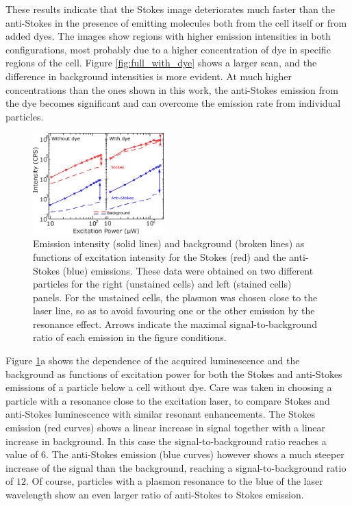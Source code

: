 \documentclass[journal=nalefd,manuscript=letter]{achemso}
\begin{document}
These results indicate that the Stokes image deteriorates much faster than the
anti-Stokes in the presence of emitting molecules both from the cell itself or
from added dyes. The images show regions with higher emission intensities in
both configurations, most probably due to a higher concentration of dye in
specific regions of the cell. Figure \ref{fig:full_with_dye} shows a larger
scan, and the difference in background intensities is more evident. At much
higher concentrations than the ones shown in this work, the anti-Stokes emission
from the dye becomes significant and can overcome the emission rate from
individual particles.

\begin{figure}[htp] \centering
\includegraphics[width=0.45\textwidth]{Figures/06_Power_Intensity/power_intensity.png}
\caption{Emission intensity (solid lines) and background (broken lines) as
functions of excitation intensity for the Stokes (red) and the anti-Stokes
(blue) emissions. These data were obtained on two different particles for the
right (unstained cells) and left (stained cells) panels. For the unstained
cells, the plasmon was chosen close to the laser line, so as to avoid favouring
one or the other emission by the resonance effect. Arrows indicate the maximal
signal-to-background ratio of each emission in the figure conditions. }
	\label{fig:power_intensity}
\end{figure}

Figure \ref{fig:power_intensity}a shows the dependence of the acquired
luminescence and the background as functions of excitation power for both the
Stokes and anti-Stokes emissions of a particle below a cell without dye. Care
was taken in choosing a particle with a resonance close to the excitation laser,
to compare Stokes and anti-Stokes luminescence with similar resonant
enhancements. The Stokes emission (red curves) shows a linear increase in signal
together with a linear increase in background. In this case the
signal-to-background ratio reaches a value of $6$. The anti-Stokes emission
(blue curves) however shows a much steeper increase of the signal than the
background, reaching a signal-to-background ratio of $12$. Of course, particles
with a plasmon resonance to the blue of the laser wavelength show an even larger
ratio of anti-Stokes to Stokes emission.
\end{document}
